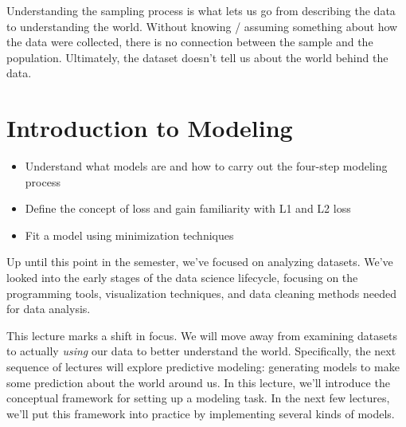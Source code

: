 \documentclass[
  letterpaper,
  DIV=11,
  numbers=noendperiod]{scrreprt}
\providecommand{\tightlist}{%
  \setlength{\itemsep}{0pt}\setlength{\parskip}{0pt}}\usepackage{longtable,booktabs,array}
\begin{document}
Understanding the sampling process is what lets us go from describing
the data to understanding the world. Without knowing / assuming
something about how the data were collected, there is no connection
between the sample and the population. Ultimately, the dataset doesn't
tell us about the world behind the data.


\hypertarget{introduction-to-modeling}{%
\chapter{Introduction to Modeling}\label{introduction-to-modeling}}

\begin{tcolorbox}[enhanced jigsaw, breakable, colbacktitle=quarto-callout-note-color!10!white, colback=white, opacitybacktitle=0.6, opacityback=0, bottomrule=.15mm, titlerule=0mm, toptitle=1mm, bottomtitle=1mm, left=2mm, colframe=quarto-callout-note-color-frame, title=\textcolor{quarto-callout-note-color}{\faInfo}\hspace{0.5em}{Note}, rightrule=.15mm, toprule=.15mm, leftrule=.75mm, arc=.35mm, coltitle=black]

\begin{itemize}
\tightlist
\item
  Understand what models are and how to carry out the four-step modeling
  process
\item
  Define the concept of loss and gain familiarity with L1 and L2 loss
\item
  Fit a model using minimization techniques
\end{itemize}

\end{tcolorbox}

Up until this point in the semester, we've focused on analyzing
datasets. We've looked into the early stages of the data science
lifecycle, focusing on the programming tools, visualization techniques,
and data cleaning methods needed for data analysis.

This lecture marks a shift in focus. We will move away from examining
datasets to actually \emph{using} our data to better understand the
world. Specifically, the next sequence of lectures will explore
predictive modeling: generating models to make some prediction about the
world around us. In this lecture, we'll introduce the conceptual
framework for setting up a modeling task. In the next few lectures,
we'll put this framework into practice by implementing several kinds of
models.
\end{document}
